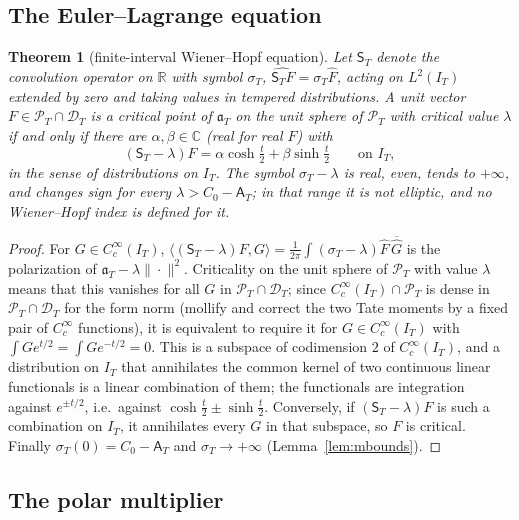 \documentclass[11pt]{amsart}
\newtheorem{theorem}{Theorem}[section]
\theoremstyle{definition}
\theoremstyle{remark}
\newcommand{\C}{\mathbb C}
\newcommand{\R}{\mathbb R}
\newcommand{\PT}{\mathcal P_T}
\newcommand{\IT}{I_T}
\newcommand{\sT}{\sigma_T}
\newcommand{\Fh}{\widehat F}
\newcommand{\Aconst}{\mathsf A_T}
\begin{document}
\subsection{The Euler--Lagrange equation}

\begin{theorem}[finite-interval Wiener--Hopf equation]\label{thm:W}
Let $\mathsf S_T$ denote the convolution operator on $\R$ with symbol $\sT$,
$\widehat{\mathsf S_TF}=\sT\Fh$, acting on $L^2(\IT)$ extended by zero and taking values in tempered
distributions. A unit vector $F\in\PT\cap\mathcal D_T$ is a critical point of $\mathfrak a_T$ on the unit
sphere of $\PT$ with critical value $\lambda$ if and only if there are $\alpha,\beta\in\C$ (real for real
$F$) with
\[
(\mathsf S_T-\lambda)F=\alpha\cosh\tfrac t2+\beta\sinh\tfrac t2\qquad\text{on }\IT,
\]
in the sense of distributions on $\IT$. The symbol $\sT-\lambda$ is real, even, tends to
$+\infty$, and changes sign for every $\lambda>C_0-\Aconst$; in that range it is not elliptic, and no
Wiener--Hopf index is defined for it.
\end{theorem}
\begin{proof}
For $G\in C_c^\infty(\IT)$, $\langle(\mathsf S_T-\lambda)F,G\rangle=\frac1{2\pi}\int(\sT-\lambda)\Fh\,\overline{\widehat G}$
is the polarization of $\mathfrak a_T-\lambda\|\cdot\|^2$. Criticality on the unit sphere of $\PT$
with value $\lambda$ means that this vanishes for all $G$ in $\PT\cap\mathcal D_T$; since
$C_c^\infty(\IT)\cap\PT$ is dense in $\PT\cap\mathcal D_T$ for the form norm (mollify and correct the two
Tate moments by a fixed pair of $C_c^\infty$ functions), it is equivalent to require it for
$G\in C_c^\infty(\IT)$ with $\int Ge^{t/2}=\int Ge^{-t/2}=0$. This is a subspace of codimension $2$
of $C_c^\infty(\IT)$, and a distribution on $\IT$ that annihilates the common kernel of two continuous
linear functionals is a linear combination of them; the functionals are integration against
$e^{\pm t/2}$, i.e.\ against $\cosh\frac t2\pm\sinh\frac t2$. Conversely, if $(\mathsf S_T-\lambda)F$
is such a combination on $\IT$, it annihilates every $G$ in that subspace, so $F$ is critical. Finally
$\sT(0)=C_0-\Aconst$ and $\sT\to+\infty$ (Lemma~\ref{lem:mbounds}).
\end{proof}

\subsection{The polar multiplier}
\end{document}
